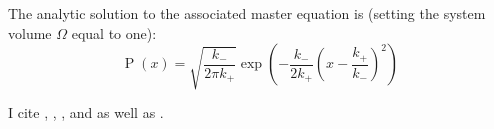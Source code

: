 \documentclass[english,letterpaper,12pt]{article}
\DeclareMathOperator{\Prob}{P}
\begin{document}
\begin{doublespacing}
The analytic solution to the associated master equation is (setting the system volume $\Omega$ equal to one):
\begin{equation}
    \Prob(x) = \sqrt{\frac{k_-}{2\pi k_+}}\exp\left( -\frac{k_-}{2k_+} \left( x - \frac{k_+}{k_-} \right)^2 \right)
    \label{eq:prod-deg-ans}
\end{equation}

I cite \cite{bistable-modeling}, \cite{we-exact}, \cite{we-chemkin}, and \cite{delay-oscillations} as well as \cite{gillespie-ssa}.

\lipsum[1]

\end{doublespacing}



\end{document}
